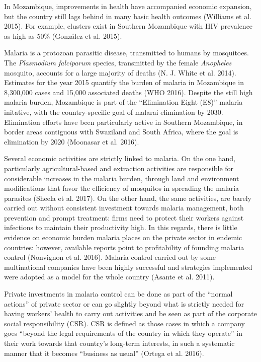 \documentclass[]{article}
\begin{document}
In Mozambique, improvements in health have accompanied economic
expansion, but the country still lags behind in many basic health
outcomes (Williams et al. 2015). For example, clusters exist in Southern
Mozambique with HIV prevalence as high as 50\% (González et al. 2015).

Malaria is a protozoan parasitic disease, transmitted to humans by
mosquitoes. The \emph{Plasmodium falciparum} species, transmitted by the
female \emph{Anopheles} mosquito, accounts for a large majority of
deaths (N. J. White et al. 2014). Estimates for the year 2015 quantify
the burden of malaria in Mozambique in 8,300,000 cases and 15,000
associated deaths (WHO 2016). Despite the still high malaria burden,
Mozambique is part of the ``Elimination Eight (E8)'' malaria initative,
with the country-specific goal of malarai elimination by 2030.
Elimination efforts have been particularly active in Southern
Mozambique, in border areas contiguous with Swaziland and South Africa,
where the goal is elimination by 2020 (Moonasar et al. 2016).

Several economic activities are strictly linked to malaria. On the one
hand, particularly agricultural-based and extraction activities are
responsible for considerable increases in the malaria burden, through
land and environment modifications that favor the efficiency of
mosquitos in spreading the malaria parasites (Sheela et al. 2017). On
the other hand, the same activities, are barely carried out without
consistent investment towards malaria management, both prevention and
prompt treatment: firms need to protect their workers against infections
to maintain their productivity high. In this regards, there is little
evidence on economic burden malaria places on the private sector in
endemic countries: however, available reports point to profitability of
founding malaria control (Nonvignon et al. 2016). Malaria control
carried out by some multinational companies have been highly successful
and strategies implemented were adopted as a model for the whole country
(Asante et al. 2011).

Private investments in malaria control can be done as part of the
``normal actions'' of private sector or can go slightly beyond what is
strictly needed for having workers' health to carry out activities and
be seen as part of the corporate social responsibility (CSR). CSR is
defined as those cases in which a company goes ``beyond the legal
requirements of the country in which they operate'' in their work
towards that country's long-term interests, in such a systematic manner
that it becomes ``business as usual'' (Ortega et al. 2016).
\end{document}
